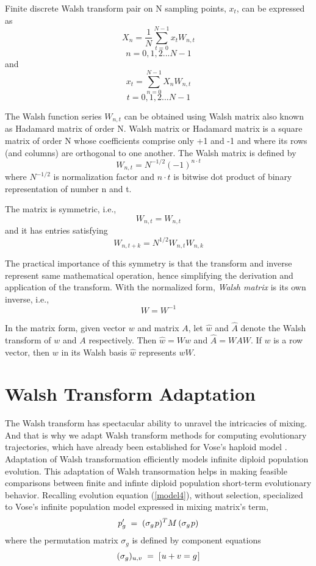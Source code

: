 Finite discrete Walsh transform pair on N sampling points, $x_t$, can be expressed as \cite{Beauchamp1975} 
\begin{equation}
\label{WalshT}
X_n = \frac{1}{N} \sum_{t=0}^{N-1} x_t W_{n,t}
\end{equation}
\[
n = 0, 1, 2...N-1
\]
and
\[
x_t = \sum_{n=0}^{N-1} X_n W_{n,t}
\]
\[
t = 0, 1, 2...N-1
\]

The Walsh function series $W_{n,t}$ can be obtained using Walsh matrix also known as Hadamard matrix of order N. 
Walsh matrix or Hadamard matrix is a square matrix of order N whose coefficients comprise only +1 and -1 and where its rows 
(and columns) are orthogonal to one another. 
The Walsh matrix is defined by
\[
W_{n,t} = N^{-1/2} (-1)^{n \cdot t}
\]
where $N^{-1/2}$ is normalization factor and $n \cdot t$ is bitwise dot product of binary representation of number n and t.

The matrix is symmetric, i.e.,
\[
W_{n,t} = W_{n,t}
\]
and it has entries satisfying
\[
W_{n, t + k} = N^{1/2} W_{n, t} W_{n, k}
\]

The practical importance of this symmetry is that the transform and inverse represent same mathematical operation, hence simplifying the derivation and application of the transform. With the normalized form, \textit{Walsh matrix} is its own inverse, i.e.,
\[
W = W^{-1}
\]

In the matrix form, given vector $w$ and matrix $A$, let $\widehat{w}$ and
$\widehat{A}$ denote the Walsh transform of $w$ and $A$ respectively. Then $\widehat{w} = Ww$ and
$\widehat{A} = WAW$. If $w$ is a row vector, then $w$ in its Walsh basis $\widehat{w}$ represents $wW$.

\section{Walsh Transform Adaptation}
The Walsh transform has spectacular ability to unravel the intricacies of mixing. And that is why we adapt Walsh transform methods for computing evolutionary trajectories, which have already been established for Vose's haploid model \cite{VoseWright1998}. Adaptation of Walsh transformation efficiently models infinite diploid population evolution. This adaptation of Walsh transormation helps in making feasible comparisons between finite and infinte diploid population short-term evolutionary behavior.
Recalling evolution equation (\ref{model4}), without selection, specialized to Vose's infinite population model expressed in mixing matrix's term,
\[
p_g^\prime \; = \; (\sigma_g \hspace{0.01in} p)^T M \, (\sigma_g \hspace{0.01in} p)
\]
where the permutation matrix $\sigma_g$ is defined by component
equations
\[
(\sigma_g)_{u,v} \; = \; [\hspace{0.01in} u+v = g\hspace{0.01in} ]
\]

